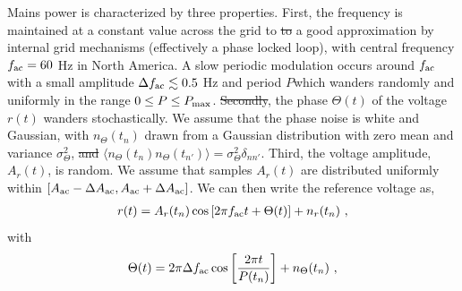 \documentclass[pra,superscriptaddress,reprint,amsmath,amssymb,nofootinbib]{revtex4-2}
\providecommand{\DIFaddtex}[1]{{\protect\color{blue}\uwave{#1}}} %
\providecommand{\DIFdeltex}[1]{{\protect\color{red}\sout{#1}}}                      %
\providecommand{\DIFaddbegin}{} %
\providecommand{\DIFaddend}{} %
\providecommand{\DIFdelbegin}{} %
\providecommand{\DIFdelend}{} %
\providecommand{\DIFadd}[1]{\texorpdfstring{\DIFaddtex{#1}}{#1}} %
\providecommand{\DIFdel}[1]{\texorpdfstring{\DIFdeltex{#1}}{}} %
\newcommand{\DIFscaledelfig}{0.5}
\newlength{\DIFdelgraphicswidth} %
\newlength{\DIFdelgraphicsheight} %
\newcommand{\DIFaddincludegraphics}[2][]{{\color{blue}\fbox{\DIFOincludegraphics[#1]{#2}}}} %
\newcommand{\DIFdelincludegraphics}[2][]{%
\sbox{\DIFdelgraphicsbox}{\DIFOincludegraphics[#1]{#2}}%
\settoboxwidth{\DIFdelgraphicswidth}{\DIFdelgraphicsbox} %
\settoboxtotalheight{\DIFdelgraphicsheight}{\DIFdelgraphicsbox} %
\scalebox{\DIFscaledelfig}{%
\parbox[b]{\DIFdelgraphicswidth}{\usebox{\DIFdelgraphicsbox}\\[-\baselineskip] \rule{\DIFdelgraphicswidth}{0em}}\llap{\resizebox{\DIFdelgraphicswidth}{\DIFdelgraphicsheight}{%
\setlength{\unitlength}{\DIFdelgraphicswidth}%
\begin{picture}(1,1)%
\thicklines\linethickness{2pt} %
{\color[rgb]{1,0,0}\put(0,0){\framebox(1,1){}}}%
{\color[rgb]{1,0,0}\put(0,0){\line( 1,1){1}}}%
{\color[rgb]{1,0,0}\put(0,1){\line(1,-1){1}}}%
\end{picture}%
}\hspace*{3pt}}} %
} %
\DeclareRobustCommand{\DIFaddbegin}{\DIFOaddbegin \let\includegraphics\DIFaddincludegraphics} %
\DeclareRobustCommand{\DIFaddend}{\DIFOaddend \let\includegraphics\DIFOincludegraphics} %
\DeclareRobustCommand{\DIFdelbegin}{\DIFOdelbegin \let\includegraphics\DIFdelincludegraphics} %
\DeclareRobustCommand{\DIFdelend}{\DIFOaddend \let\includegraphics\DIFOincludegraphics} %
\begin{document}
 
 Mains power is characterized by three properties. First, the frequency is maintained at a constant value across the grid to \DIFdelbegin \DIFdel{to }\DIFdelend a good approximation by internal grid mechanisms (effectively a phase locked loop), with central frequency $f_{\rm ac} = 60$ Hz in North America. A slow periodic modulation occurs around $f_{\rm ac}$ with a small amplitude $\Delta f_{\rm ac} \lesssim 0.5$ Hz and period $P$\DIFaddbegin \DIFadd{, }\DIFaddend which wanders randomly and uniformly in the range $0 \leq P \leq P_{\rm max}$. \DIFdelbegin \DIFdel{Secondly}\DIFdelend \DIFaddbegin \DIFadd{Second}\DIFaddend , the phase \DIFaddbegin \DIFadd{offset }\DIFaddend $\Theta(t)$ of the voltage $r(t)$ wanders stochastically. We assume that the phase noise is white and Gaussian, with $n_{\Theta}(t_n)$ drawn from a Gaussian distribution with zero mean and variance $\sigma_{\Theta}^2$, \DIFdelbegin \DIFdel{and }\DIFdelend \DIFaddbegin \DIFadd{i.e. }\DIFaddend $\langle n_{\Theta} (t_n) n_{\Theta} (t_{n'})\rangle = \sigma^2_{\Theta} \delta_{n n'}$. Third, the voltage amplitude, $A_r(t)$, is random. We assume that samples $A_r(t)$ are distributed uniformly within $[A_{\rm ac} - \Delta A_{\rm ac} , A_{\rm ac} + \Delta A_{\rm ac}]$. We can then write the reference voltage as,
 \begin{eqnarray}
 	r(t) = A_r(t_n) \cos \left[ 2 \pi f_{\rm ac} t + \Theta(t)\right] +n_r(t_n) \ ,
 	\label{eq:voltage}
 \end{eqnarray}
with
 \begin{eqnarray}
\Theta(t) = 2 \pi \Delta f_{\rm ac} \cos\DIFdelbegin %
\DIFdelend \DIFaddbegin \left[\DIFaddend \frac{2 \pi t}{P(t_n)}\DIFdelbegin %
\DIFdelend \DIFaddbegin \right] \DIFaddend + n_{\Theta} (t_n) \ ,
\label{eq:voltage_theta}
\end{eqnarray}
\end{document}
